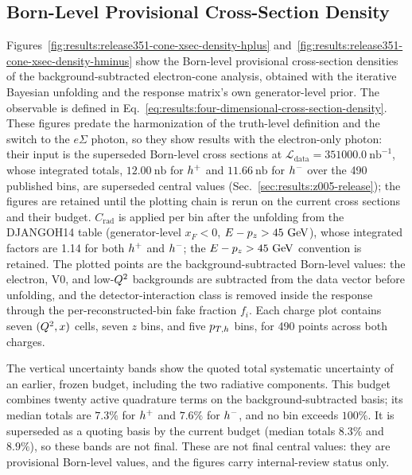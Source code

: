 \subsection{Born-Level Provisional Cross-Section Density}
\label{sec:results:release351-expanded-xsec-density}

Figures~\ref{fig:results:release351-cone-xsec-density-hplus}
and~\ref{fig:results:release351-cone-xsec-density-hminus} show the Born-level
provisional cross-section densities of the background-subtracted
electron-cone analysis, obtained with the iterative Bayesian unfolding and the
response matrix's own generator-level prior.  The observable is
defined in Eq.~\ref{eq:results:four-dimensional-cross-section-density}.
These figures predate the harmonization of the truth-level definition and the
switch to the $e\Sigma$ photon, so they show results with the electron-only photon: their input is
the superseded Born-level cross sections at
$\mathcal{L}_{\mathrm{data}}=351000.0~\mathrm{nb}^{-1}$, whose integrated
totals, $12.00~\mathrm{nb}$ for $h^{+}$ and $11.66~\mathrm{nb}$ for
$h^{-}$ over the 490 published bins, are superseded central values
(Sec.~\ref{sec:results:z005-release}); the figures are retained until the
plotting chain is rerun on the current cross sections and their
budget.  $C_{\mathrm{rad}}$ is applied
per bin after the unfolding from the DJANGOH14 table (generator-level $x_F<0$, $E-p_z>45~\text{GeV}$), whose
integrated factors are 1.14 for both $h^{+}$ and $h^{-}$; the
$E-p_z>45~\text{GeV}$ convention is retained.  The plotted points are the
background-subtracted Born-level values: the electron, V0, and low-$Q^{2}$
backgrounds are subtracted from the data vector before unfolding, and the
detector-interaction class is removed inside the response through the
per-reconstructed-bin fake fraction $f_i$.  Each charge plot contains seven
$(Q^{2},x)$ cells, seven $z$ bins, and five $p_{T,h}$ bins, for 490 points across
both charges.

The vertical uncertainty bands show the quoted total systematic uncertainty of
an earlier, frozen budget, including the two radiative components.  This
budget combines twenty active quadrature terms on the background-subtracted
basis; its median totals are $7.3\%$ for $h^{+}$ and
$7.6\%$ for $h^{-}$, and no bin exceeds $100\%$.  It is
superseded as a quoting basis by the current budget (median totals
$8.3\%$ and $8.9\%$), so these bands are not final.  These are not final
central values: they are provisional Born-level values,
and the figures carry internal-review status only.

